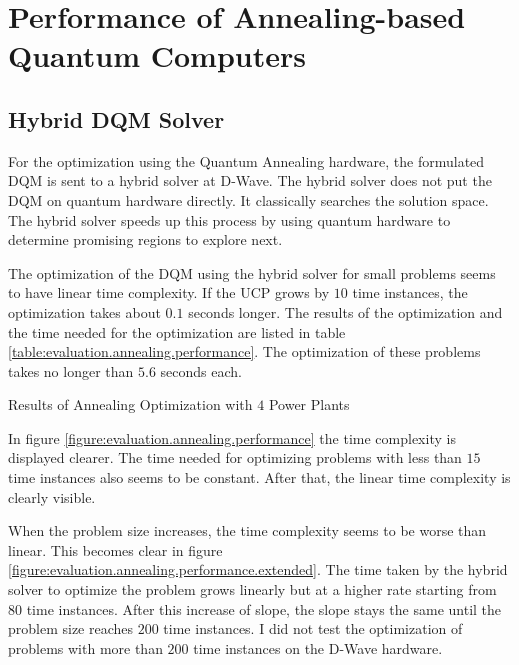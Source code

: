 \section{Performance of Annealing-based Quantum Computers}

\subsection{Hybrid DQM Solver}

For the optimization using the Quantum Annealing hardware, the formulated DQM is sent to a hybrid solver at D-Wave.
The hybrid solver does not put the DQM on quantum hardware directly.
It classically searches the solution space.
The hybrid solver speeds up this process by using quantum hardware to determine promising regions to explore next.
\cite{DQMHybrid2020}

The optimization of the DQM using the hybrid solver for small problems seems to have linear time complexity.
If the UCP grows by $10$ time instances, the optimization takes about $0.1$ seconds longer.
The results of the optimization and the time needed for the optimization are listed in table \ref{table:evaluation.annealing.performance}.
The optimization of these problems takes no longer than $5.6$ seconds each.

\begin{table}[ht]
  \centering
  
  \caption{Results of Annealing Optimization with $4$ Power Plants}
  \label{table:evaluation.annealing.performance}
\end{table}

In figure \ref{figure:evaluation.annealing.performance} the time complexity is displayed clearer.
The time needed for optimizing problems with less than $15$ time instances also seems to be constant.
After that, the linear time complexity is clearly visible.

When the problem size increases, the time complexity seems to be worse than linear.
This becomes clear in figure \ref{figure:evaluation.annealing.performance.extended}.
The time taken by the hybrid solver to optimize the problem grows linearly but at a higher rate starting from $80$ time instances.
After this increase of slope, the slope stays the same until the problem size reaches $200$ time instances.
I did not test the optimization of problems with more than $200$ time instances on the D-Wave hardware.

